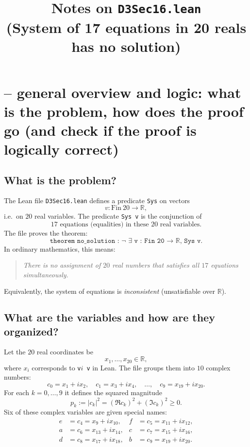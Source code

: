 \documentclass[11pt]{article}
\title{Notes on \texttt{D3Sec16.lean}\\(System of 17 equations in 20 reals has no solution)}
\author{}
\date{}
\begin{document}
\maketitle

\section*{-- general overview and logic: what is the problem, how does the proof go (and check if the proof is logically correct)}

\subsection*{What is the problem?}

The Lean file \texttt{D3Sec16.lean} defines a predicate \texttt{Sys} on vectors
\[
v : \mathrm{Fin}\ 20 \to \mathbb{R},
\]
i.e.\ on $20$ real variables.  The predicate \texttt{Sys v} is the conjunction of
\[
17 \text{ equations (equalities) in these } 20 \text{ real variables.}
\]
The file proves the theorem:
\[
\texttt{theorem no\_solution : ¬ ∃ v : Fin 20 → ℝ, Sys v.}
\]
In ordinary mathematics, this means:

\begin{quote}
\emph{There is no assignment of $20$ real numbers that satisfies all $17$ equations simultaneously.}
\end{quote}

Equivalently, the system of equations is \emph{inconsistent} (unsatisfiable over $\mathbb{R}$).

\subsection*{What are the variables and how are they organized?}

Let the $20$ real coordinates be
\[
x_1,\dots,x_{20}\in\mathbb{R},
\]
where $x_i$ corresponds to \texttt{v$i$ v} in Lean.  The file groups them into $10$ complex numbers:
\[
c_0 = x_1 + i x_2,\quad
c_1 = x_3 + i x_4,\quad \dots,\quad
c_9 = x_{19} + i x_{20}.
\]
For each $k=0,\dots,9$ it defines the squared magnitude
\[
p_k := |c_k|^2 = (\Re c_k)^2 + (\Im c_k)^2 \ge 0.
\]
Six of these complex variables are given special names:
\[
\begin{aligned}
e &= c_4 = x_9 + i x_{10},&
f &= c_5 = x_{11} + i x_{12},\\
a &= c_6 = x_{13} + i x_{14},&
c &= c_7 = x_{15} + i x_{16},\\
d &= c_8 = x_{17} + i x_{18},&
b &= c_9 = x_{19} + i x_{20}.
\end{aligned}
\]
\end{document}
